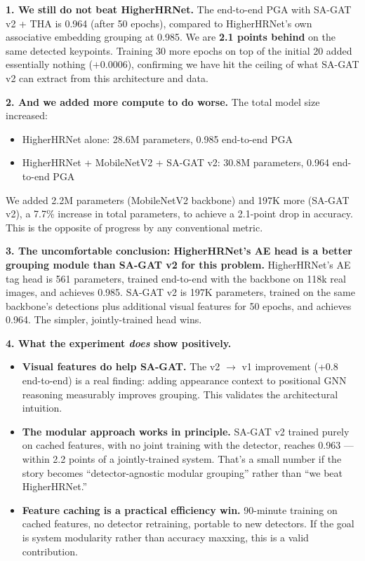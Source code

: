 \textbf{1. We still do not beat HigherHRNet.} The end-to-end PGA with SA-GAT v2 + THA is 0.964 (after 50 epochs), compared to HigherHRNet's own associative embedding grouping at 0.985. We are \textbf{2.1 points behind} on the same detected keypoints. Training 30 more epochs on top of the initial 20 added essentially nothing ($+0.0006$), confirming we have hit the ceiling of what SA-GAT v2 can extract from this architecture and data.

\textbf{2. And we added more compute to do worse.} The total model size increased:
\begin{itemize}
    \item HigherHRNet alone: 28.6M parameters, 0.985 end-to-end PGA
    \item HigherHRNet + MobileNetV2 + SA-GAT v2: 30.8M parameters, 0.964 end-to-end PGA
\end{itemize}
We added 2.2M parameters (MobileNetV2 backbone) and 197K more (SA-GAT v2), a 7.7\% increase in total parameters, to achieve a 2.1-point drop in accuracy. This is the opposite of progress by any conventional metric.

\textbf{3. The uncomfortable conclusion: HigherHRNet's AE head is a better grouping module than SA-GAT v2 for this problem.} HigherHRNet's AE tag head is 561 parameters, trained end-to-end with the backbone on 118k real images, and achieves 0.985. SA-GAT v2 is 197K parameters, trained on the same backbone's detections plus additional visual features for 50 epochs, and achieves 0.964. The simpler, jointly-trained head wins.

\textbf{4. What the experiment \emph{does} show positively.}
\begin{itemize}
    \item \textbf{Visual features do help SA-GAT.} The v2 $\to$ v1 improvement (+0.8 end-to-end) is a real finding: adding appearance context to positional GNN reasoning measurably improves grouping. This validates the architectural intuition.
    \item \textbf{The modular approach works in principle.} SA-GAT v2 trained purely on cached features, with no joint training with the detector, reaches 0.963 --- within 2.2 points of a jointly-trained system. That's a small number if the story becomes ``detector-agnostic modular grouping'' rather than ``we beat HigherHRNet.''
    \item \textbf{Feature caching is a practical efficiency win.} 90-minute training on cached features, no detector retraining, portable to new detectors. If the goal is system modularity rather than accuracy maxxing, this is a valid contribution.
\end{itemize}

